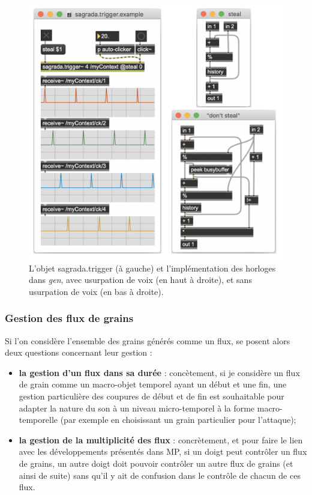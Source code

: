 \begin{figure}[!htbp]
	\captionsetup{format=plain}
	\includegraphics[width=\textwidth]{gfx/04_algorithms/Sagrada-TriggerClock.png}
	\caption[Sagrada : horloge synchrone et assignation]{L'objet sagrada.trigger (à gauche) et l'implémentation des horloges dans \textit{gen}, avec usurpation de voix (en haut à droite), et sans usurpation de voix (en bas à droite).}
	\label{fig:algorithms:MP-TriggerClock}
\end{figure}

\subsubsection{Gestion des flux de grains}

\noindent Si l'on considère l'ensemble des grains générés comme un flux, se posent alors deux questions concernant leur gestion :
\vspace{-1em}
\begin{itemize}[noitemsep]
	\item \textbf{la gestion d'un flux dans sa durée} : concètement, si je considère un flux de grain comme un macro-objet temporel ayant un début et une fin, une gestion particulière des coupures de début et de fin est souhaitable pour adapter la nature du son à un niveau micro-temporel à la forme macro-temporelle (par exemple en choisissant un grain particulier pour l'attaque);
	\item \textbf{la gestion de la multiplicité des flux} : concrètement, et pour faire le lien avec les développements présentés dans MP, si un doigt peut contrôler un flux de grains, un autre doigt doit pouvoir contrôler un autre flux de grains (et ainsi de suite) sans qu'il y ait de confusion dans le contrôle de chacun de ces flux.
\end{itemize}

